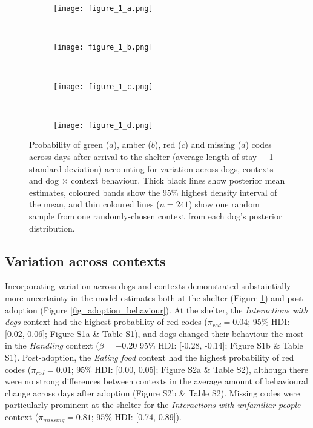 \documentclass[12pt]{article}
\begin{document}
\begin{figure}[t!]
  \hspace{-2cm}%
  \begin{subfigure}{0.4\textwidth}
    \centering
    \texttt{[image: figure\_1\_a.png]}
  \end{subfigure}%
  ~%
  \hspace{-2cm}
  \begin{subfigure}{0.4\textwidth}
    \centering
    \texttt{[image: figure\_1\_b.png]}
  \end{subfigure}%
  ~%
  \hspace{-2cm}
  \begin{subfigure}{0.4\textwidth}
    \centering
    \texttt{[image: figure\_1\_c.png]}
  \end{subfigure}%
  ~%
  \hspace{-2cm}
  \begin{subfigure}{0.4\textwidth}
    \centering
    \texttt{[image: figure\_1\_d.png]}
  \end{subfigure}%

  \caption{Probability of green ($a$), amber ($b$), red ($c$) and missing ($d$) codes across days after arrival to the shelter (average length of stay + 1 standard deviation) accounting for variation across dogs, contexts and dog $\times$ context behaviour. Thick black lines show posterior mean estimates, coloured bands show the 95\% highest density interval of the mean, and thin coloured lines ($n = 241$) show one random sample from one randomly-chosen context from each dog's posterior distribution.}
  \label{fig_shelter_behaviour}
\end{figure}

\subsection{Variation across contexts}
Incorporating variation across dogs and contexts demonstrated substaintially more uncertainty in the model estimates both at the shelter (Figure \ref{fig_shelter_behaviour}) and post-adoption (Figure \ref{fig_adoption_behaviour}). At the shelter, the \textit{Interactions with dogs} context had the highest probability of red codes ($\pi_{red} = 0.04$; 95\% HDI: [0.02, 0.06]; Figure S1a \& Table S1), and dogs changed their behaviour the most in the \textit{Handling} context ($\beta = -0.20$ 95\% HDI: [-0.28, -0.14]; Figure S1b \& Table S1). Post-adoption, the \textit{Eating food} context had the highest probability of red codes ($\pi_{red} = 0.01$; 95\% HDI: [0.00, 0.05]; Figure S2a \& Table S2), although there were no strong differences between contexts in the average amount of behavioural change across days after adoption (Figure S2b \& Table S2). Missing codes were particularly prominent at the shelter for the \textit{Interactions with unfamiliar people} context ($\pi_{missing} = 0.81$; 95\% HDI: [0.74, 0.89]).
\end{document}
